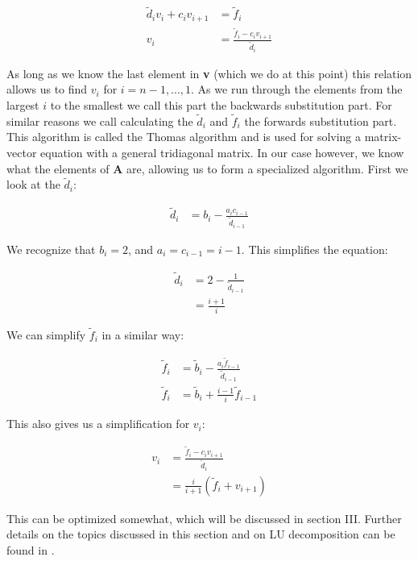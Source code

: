 \documentclass[english,notitlepage,reprint,nofootinbib]{revtex4-1}  %
\begin{document}
\begin{align*}
\tilde{d}_i v_i  + c_i v_{i+1} &= \tilde{f}_i \\
v_i &= \frac{\tilde{f}_i - c_i v_{i+1}}{\tilde{d}_i}
\end{align*}

As long as we know the last element in \textbf{v} (which we do at this point) this relation allows us to find $v_i$ for $i = n-1,...,1$. As we run through the elements from the largest $i$ to the smallest we call this part the backwards substitution part. For similar reasons we call calculating the $\tilde{d}_i$ and $\tilde{f}_i$ the forwards substitution part. This algorithm is called the Thomas algorithm \citep{Thomas1949} and is used for solving a matrix-vector equation with a general tridiagonal matrix. In our case however, we know what the elements of \textbf{A} are, allowing us to form a specialized algorithm. First we look at the $\tilde{d}_i$:

\begin{align*}
\tilde{d}_i &= b_i - \frac{a_i c_{i-1}}{\tilde{d}_{i-1}}
\end{align*}

We recognize that $b_i = 2$, and $a_i = c_{i-1} = i-1$. This simplifies the equation:

\begin{align*}
\tilde{d}_i &= 2 - \frac{1}{\tilde{d}_{i-1}} \\
&= \frac{i+1}{i}
\end{align*}

We can simplify $\tilde{f}_i$ in a similar way:

\begin{align*}
\tilde{f}_i &= \tilde{b}_i - \frac{a_i \tilde{f}_{i-1}}{\tilde{d}_{i-1}} \\
\tilde{f}_i &= \tilde{b}_i + \frac{i-1}{i}\tilde{f}_{i-1}
\end{align*}

This also gives us a simplification for $v_i$:

\begin{align*}
v_i &= \frac{\tilde{f}_i - c_i v_{i+1}}{\tilde{d}_i} \\
&= \frac{i}{i+1}(\tilde{f}_i + v_{i+1})
\end{align*}

This can be optimized somewhat, which will be discussed in section III. Further details on the topics discussed in this section and on LU decomposition can be found in \citep{Hjorth-Jensen2015}.
\end{document}
